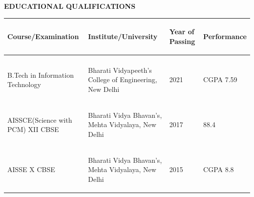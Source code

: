 \documentclass[10pt]{article}
\begin{document}
\begin{minipage}{0.95\textwidth}
\vspace{5mm}
\begin{huge}
\textbf{\color{theme}EDUCATIONAL QUALIFICATIONS}
\end{huge}
\begin{mdframed}[backgroundcolor=theme]
\end{mdframed}

\vspace{1mm}

\begin{tabular}{||m{4cm}|m{4cm}|m{2cm}|m{3cm}||}
\hline
\hline

\begin{center}
\textbf{Course/Examination}
\end{center} & \begin{center}
\textbf{Institute/University}
\end{center} & \begin{center}
\textbf{Year of Passing}
\end{center} & \begin{center}
\textbf{Performance}
\end{center}\\
\hline
&&&\\
\begin{center}
B.Tech in Information Technology
\end{center} & \begin{center}
Bharati Vidyapeeth's College of Engineering, New Delhi
\end{center} & \begin{center}
2021
\end{center} & \begin{center}
CGPA 7.59
\end{center}\\
\hline
\begin{center}
AISSCE(Science with PCM) XII CBSE
\end{center} & \begin{center}
Bharati Vidya Bhavan's, Mehta Vidyalaya, New Delhi
\end{center} & \begin{center}
2017
\end{center} & \begin{center}
88.4%
\end{center}\\
\hline
\begin{center}
AISSE X CBSE
\end{center} & \begin{center}
Bharati Vidya Bhavan's, Mehta Vidyalaya, New Delhi
\end{center} & \begin{center}
2015
\end{center} & \begin{center}
CGPA 8.8
\end{center}\\
\hline
\hline

\end{tabular}

\end{minipage}
\end{document}
